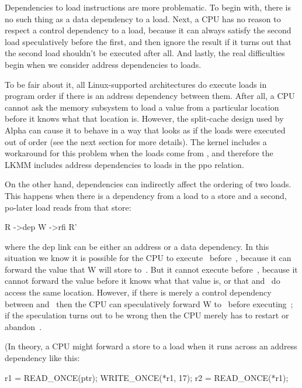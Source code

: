 Dependencies to load instructions are more problematic.
To begin with,
there is no such thing as a data dependency to a load.
Next, a CPU has no reason to respect a control dependency to a load, because it
can always satisfy the second load speculatively before the first, and
then ignore the result if it turns out that the second load shouldn't
be executed after all.
And lastly, the real difficulties begin when
we consider address dependencies to loads.

To be fair about it, all Linux-supported architectures do execute
loads in program order if there is an address dependency between them.
After all, a CPU cannot ask the memory subsystem to load a value from
a particular location before it knows what that location is.
However,
the split-cache design used by Alpha can cause it to behave in a way
that looks as if the loads were executed out of order (see the next
section for more details).
The kernel includes a workaround for this
problem when the loads come from , and therefore the LKMM
includes address dependencies to loads in the ppo relation.

On the other hand, dependencies can indirectly affect the ordering of
two loads.
This happens when there is a dependency from a load to a
store and a second, po-later load reads from that store:

\begin{VerbatimU}
	R ->dep W ->rfi R'
\end{VerbatimU}

\noindent%
where the dep link can be either an address or a data dependency.
In this situation we know it is possible for the CPU to execute~
before~, because it can forward the value that W will store to~.
But it cannot execute  before~, because it cannot forward the value before
it knows what that value is, or that  and~ do access the same
location.
However, if there is merely a control dependency between 
and~ then the CPU can speculatively forward W to~ before
executing~; if the speculation turns out to be wrong then the
CPU merely has to restart or abandon~.

(In theory, a CPU might forward a store to a load when it runs across
an address dependency like this:

\begin{VerbatimU}
	r1 = READ_ONCE(ptr);
	WRITE_ONCE(*r1, 17);
	r2 = READ_ONCE(*r1);
\end{VerbatimU}

